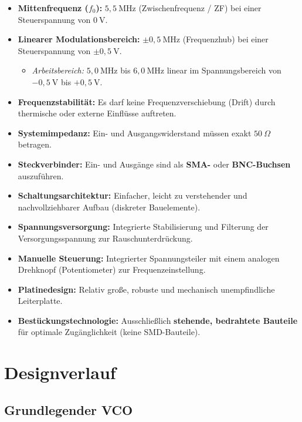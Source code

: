 \documentclass[
  ngerman,
  11pt,
  a4paper,
  DIV=11,
  twoside]{scrreprt}
\providecommand{\tightlist}{%
  \setlength{\itemsep}{0pt}\setlength{\parskip}{0pt}}
\begin{document}
\begin{itemize}
\item
  \textbf{Mittenfrequenz (\(f_0\)):} \(5,5~\text{MHz}\)
  (Zwischenfrequenz / ZF) bei einer Steuerspannung von \(0~\text{V}\).
\item
  \textbf{Linearer Modulationsbereich:} \(\pm 0,5~\text{MHz}\)
  (Frequenzhub) bei einer Steuerspannung von \(\pm 0,5~\text{V}\).

  \begin{itemize}
  \tightlist
  \item
    \emph{Arbeitsbereich:} \(5,0~\text{MHz}\) bis \(6,0~\text{MHz}\)
    linear im Spannungsbereich von \(-0,5~\text{V}\) bis
    \(+0,5~\text{V}\).
  \end{itemize}
\item
  \textbf{Frequenzstabilität:} Es darf keine Frequenzverschiebung
  (Drift) durch thermische oder externe Einflüsse auftreten.
\item
  \textbf{Systemimpedanz:} Ein- und Ausgangswiderstand müssen exakt
  \(50~\Omega\) betragen.
\item
  \textbf{Steckverbinder:} Ein- und Ausgänge sind als \textbf{SMA-} oder
  \textbf{BNC-Buchsen} auszuführen.
\item
  \textbf{Schaltungsarchitektur:} Einfacher, leicht zu verstehender und
  nachvollziehbarer Aufbau (diskreter Bauelemente).
\item
  \textbf{Spannungsversorgung:} Integrierte Stabilisierung und Filterung
  der Versorgungsspannung zur Rauschunterdrückung.
\item
  \textbf{Manuelle Steuerung:} Integrierter Spannungsteiler mit einem
  analogen Drehknopf (Potentiometer) zur Frequenzeinstellung.
\item
  \textbf{Platinedesign:} Relativ große, robuste und mechanisch
  unempfindliche Leiterplatte.
\item
  \textbf{Bestückungstechnologie:} Ausschließlich \textbf{stehende,
  bedrahtete Bauteile} für optimale Zugänglichkeit (keine SMD-Bauteile).
\end{itemize}

\chapter{Designverlauf}\label{designverlauf}

\section{Grundlegender VCO}\label{grundlegender-vco}
\end{document}
